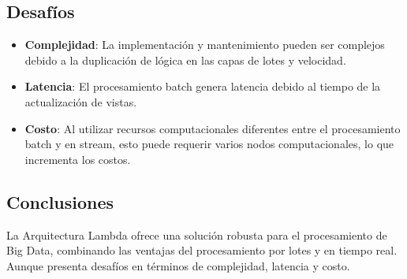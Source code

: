\subsection{Desafíos}
\begin{itemize}
\item \textbf{Complejidad}: La implementación y mantenimiento pueden ser complejos debido a la duplicación de lógica en las capas de lotes y velocidad.
\item \textbf{Latencia}: El procesamiento batch genera latencia debido al tiempo de la actualización de vistas.
\item \textbf{Costo}: Al utilizar recursos computacionales diferentes entre el procesamiento batch y en stream, esto puede requerir varios nodos computacionales, lo que incrementa los costos.
\end{itemize}

\subsection{Conclusiones}
La Arquitectura Lambda ofrece una solución robusta para el procesamiento de Big Data, combinando las ventajas del procesamiento por lotes y en tiempo real. Aunque presenta desafíos en términos de complejidad, latencia y costo.
\newpage